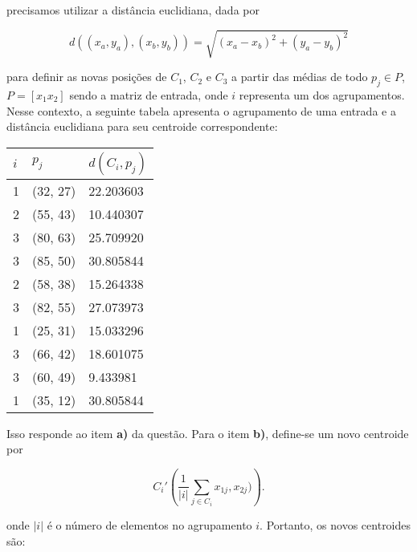 \noindent
precisamos utilizar a distância euclidiana, dada por

\begin{equation}
    d((x_a, y_a), (x_b, y_b)) = \sqrt{(x_a - x_b)^2 + (y_a - y_b)^2}
\end{equation}

\noindent
para definir as novas posições de $C_1$, $C_2$ e $C_3$ a partir das médias de todo $p_j \in P$, $P = [ x_1 x_2 ]$ sendo a matriz de entrada, onde $i$ representa um dos agrupamentos. Nesse contexto, a seguinte tabela apresenta o agrupamento de uma entrada e a distância euclidiana para seu centroide correspondente:

\begin{center}
    \begin{tabular}{lll}
        \hline
        $i$                 & $p_j$     &   $d(C_i, p_j)$   \\     
        \hline
        1                   & (32, 27)  &   22.203603       \\
        2                   & (55, 43)  &   10.440307       \\
        3                   & (80, 63)  &   25.709920       \\
        3                   & (85, 50)  &   30.805844       \\
        2                   & (58, 38)  &   15.264338       \\
        3                   & (82, 55)  &   27.073973       \\
        1                   & (25, 31)  &   15.033296       \\
        3                   & (66, 42)  &   18.601075       \\
        3                   & (60, 49)  &   9.433981        \\
        1                   & (35, 12)  &   30.805844       \\
         \hline
    \end{tabular}
\end{center}

Isso responde ao item \textbf{a)} da questão. Para o item \textbf{b)}, define-se um novo centroide por

\begin{equation*}
    C_{i}'\left( \dfrac{1}{|i|}  \sum_{j \in C_{i}} x_{1j}, x_{2j}) \right).
\end{equation*}

\noindent
onde $|i|$ é o número de elementos no agrupamento $i$. Portanto, os novos centroides são:

